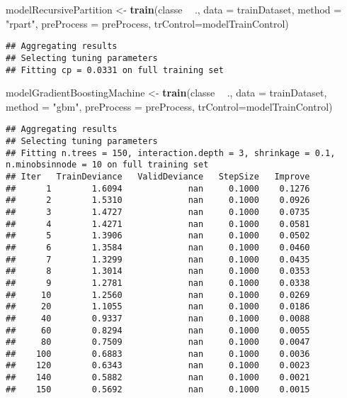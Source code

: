 \documentclass[]{article}
\newenvironment{Shaded}{\begin{snugshade}}{\end{snugshade}}
\newcommand{\KeywordTok}[1]{\textcolor[rgb]{0.13,0.29,0.53}{\textbf{#1}}}
\newcommand{\DataTypeTok}[1]{\textcolor[rgb]{0.13,0.29,0.53}{#1}}
\newcommand{\StringTok}[1]{\textcolor[rgb]{0.31,0.60,0.02}{#1}}
\newcommand{\OperatorTok}[1]{\textcolor[rgb]{0.81,0.36,0.00}{\textbf{#1}}}
\newcommand{\NormalTok}[1]{#1}
\begin{document}
\begin{Shaded}
\begin{Highlighting}[]
\NormalTok{modelRecursivePartition      <-}\StringTok{ }\KeywordTok{train}\NormalTok{(classe }\OperatorTok{~}\StringTok{ }\NormalTok{., }\DataTypeTok{data =}\NormalTok{ trainDataset, }\DataTypeTok{method =} \StringTok{"rpart"}\NormalTok{,   }\DataTypeTok{preProcess =}\NormalTok{ preProcess, }\DataTypeTok{trControl=}\NormalTok{modelTrainControl)}
\end{Highlighting}
\end{Shaded}

\begin{verbatim}
## Aggregating results
## Selecting tuning parameters
## Fitting cp = 0.0331 on full training set
\end{verbatim}

\begin{Shaded}
\begin{Highlighting}[]
\NormalTok{modelGradientBoostingMachine <-}\StringTok{ }\KeywordTok{train}\NormalTok{(classe }\OperatorTok{~}\StringTok{ }\NormalTok{., }\DataTypeTok{data =}\NormalTok{ trainDataset, }\DataTypeTok{method =} \StringTok{"gbm"}\NormalTok{,     }\DataTypeTok{preProcess =}\NormalTok{ preProcess, }\DataTypeTok{trControl=}\NormalTok{modelTrainControl)}
\end{Highlighting}
\end{Shaded}

\begin{verbatim}
## Aggregating results
## Selecting tuning parameters
## Fitting n.trees = 150, interaction.depth = 3, shrinkage = 0.1, n.minobsinnode = 10 on full training set
## Iter   TrainDeviance   ValidDeviance   StepSize   Improve
##      1        1.6094             nan     0.1000    0.1276
##      2        1.5310             nan     0.1000    0.0926
##      3        1.4727             nan     0.1000    0.0735
##      4        1.4271             nan     0.1000    0.0581
##      5        1.3906             nan     0.1000    0.0502
##      6        1.3584             nan     0.1000    0.0460
##      7        1.3299             nan     0.1000    0.0435
##      8        1.3014             nan     0.1000    0.0353
##      9        1.2781             nan     0.1000    0.0338
##     10        1.2560             nan     0.1000    0.0269
##     20        1.1055             nan     0.1000    0.0186
##     40        0.9337             nan     0.1000    0.0088
##     60        0.8294             nan     0.1000    0.0055
##     80        0.7509             nan     0.1000    0.0047
##    100        0.6883             nan     0.1000    0.0036
##    120        0.6343             nan     0.1000    0.0023
##    140        0.5882             nan     0.1000    0.0021
##    150        0.5692             nan     0.1000    0.0015
\end{verbatim}
\end{document}
